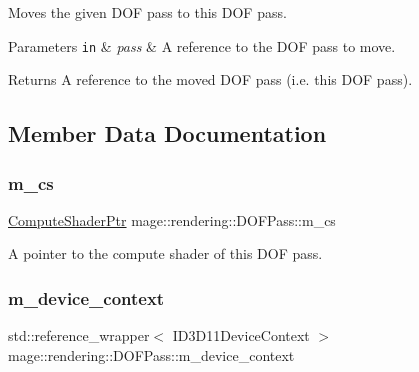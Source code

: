 Moves the given D\+OF pass to this D\+OF pass.


\begin{DoxyParams}[1]{Parameters}
\mbox{\tt in}  & {\em pass} & A reference to the D\+OF pass to move. \\
\hline
\end{DoxyParams}
\begin{DoxyReturn}{Returns}
A reference to the moved D\+OF pass (i.\+e. this D\+OF pass). 
\end{DoxyReturn}


\subsection{Member Data Documentation}
\hypertarget{classmage_1_1rendering_1_1_d_o_f_pass_aad575c41dc3427fee1135b68d3d680ce}{}\label{classmage_1_1rendering_1_1_d_o_f_pass_aad575c41dc3427fee1135b68d3d680ce} 
\subsubsection{\texorpdfstring{m\+\_\+cs}{m\_cs}}
{\footnotesize\ttfamily \hyperlink{namespacemage_1_1rendering_ab3dc9f2114f2e9255b91d9c051da52ea}{Compute\+Shader\+Ptr} mage\+::rendering\+::\+D\+O\+F\+Pass\+::m\+\_\+cs\hspace{0.3cm}{\ttfamily [private]}}

A pointer to the compute shader of this D\+OF pass. \hypertarget{classmage_1_1rendering_1_1_d_o_f_pass_a53f1f35ccb35c6e4f46ab4349acc768f}{}\label{classmage_1_1rendering_1_1_d_o_f_pass_a53f1f35ccb35c6e4f46ab4349acc768f} 
\subsubsection{\texorpdfstring{m\+\_\+device\+\_\+context}{m\_device\_context}}
{\footnotesize\ttfamily std\+::reference\+\_\+wrapper$<$ I\+D3\+D11\+Device\+Context $>$ mage\+::rendering\+::\+D\+O\+F\+Pass\+::m\+\_\+device\+\_\+context\hspace{0.3cm}{\ttfamily [private]}}

